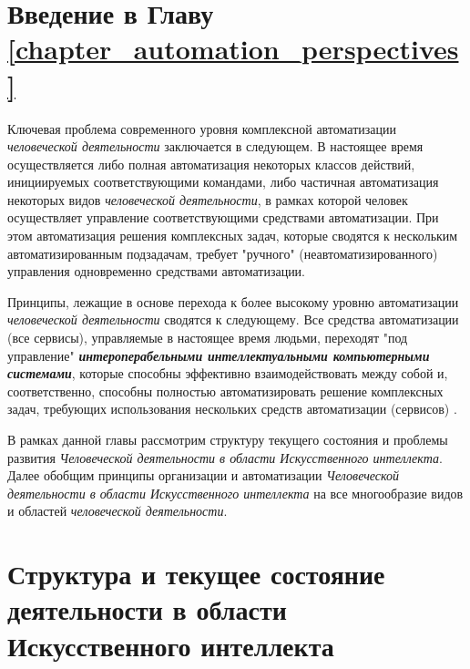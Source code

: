 \section*{Введение в Главу \ref{chapter_automation_perspectives}}
Ключевая проблема современного уровня комплексной автоматизации \textit{человеческой деятельности} заключается в следующем. В настоящее время осуществляется либо полная автоматизация некоторых классов действий, инициируемых соответствующими командами, либо частичная автоматизация некоторых видов \textit{человеческой деятельности}, в рамках которой человек осуществляет управление соответствующими средствами автоматизации. При этом автоматизация решения комплексных задач, которые сводятся к нескольким  автоматизированным подзадачам, требует "ручного"{} (неавтоматизированного) управления одновременно  средствами автоматизации.

Принципы, лежащие в основе перехода к более высокому уровню автоматизации \textit{человеческой деятельности} сводятся к следующему. Все средства автоматизации (все сервисы), управляемые в настоящее время людьми, переходят "под управление"{} \textbf{\textit{интероперабельными интеллектуальными компьютерными системами}}, которые способны эффективно взаимодействовать между собой и, соответственно, способны полностью автоматизировать решение комплексных задач, требующих использования нескольких средств автоматизации (сервисов) .

В рамках данной главы рассмотрим структуру текущего состояния и проблемы развития \textit{Человеческой деятельности в области Искусственного интеллекта}. Далее обобщим принципы организации и автоматизации \textit{Человеческой деятельности в области Искусственного интеллекта} на все многообразие видов и областей \textit{человеческой деятельности}.

\section{Структура и текущее состояние деятельности в области Искусственного интеллекта}
\label{sec_activity_ai}

